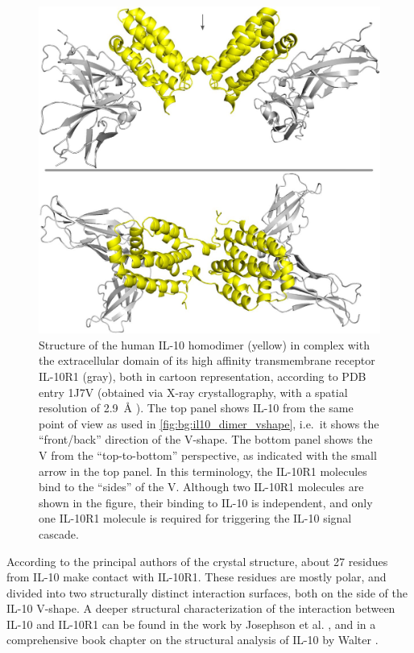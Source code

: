\begin{figure}
\centering
\includegraphics[width=1.0\textwidth]{gfx/background/il10r1_il10_complex_topside_02.jpg}
\caption[]{
Structure of the human IL-10 homodimer (yellow) in complex with the
extracellular domain of its high affinity transmembrane receptor IL-10R1 (gray),
both in cartoon representation, according to PDB entry 1J7V (obtained via X-ray
crystallography, with a spatial resolution of \SI{2.9}{\angstrom}
\cite{Josephson2001}). The top panel shows IL-10 from the same point of view as
used in \cref{fig:bg:il10_dimer_vshape}, i.e.\ it shows the \enquote{front/back}
direction of the V-shape. The bottom panel shows the V from the
\enquote{top-to-bottom} perspective, as indicated with the small arrow in the
top panel. In this terminology, the IL-10R1 molecules bind to the
\enquote{sides} of the V. Although two IL-10R1 molecules are shown in the
figure, their binding to IL-10 is independent, and only one IL-10R1 molecule is
required for triggering the IL-10 signal cascade.}
\label{fig:bg:il10_il10r1_complex}
\end{figure}

According to the principal authors of the crystal structure, about 27 residues
from IL-10 make contact with IL-10R1. These residues are mostly polar, and
divided into two structurally distinct interaction surfaces, both on the side of
the IL-10 V-shape. A deeper structural characterization of the interaction
between IL-10 and IL-10R1 can be found in the work by Josephson et al.
\cite{Josephson2001}, and in a comprehensive book chapter on the structural
analysis of IL-10 by Walter \cite{bookchapter_walter_il10_2004}.


